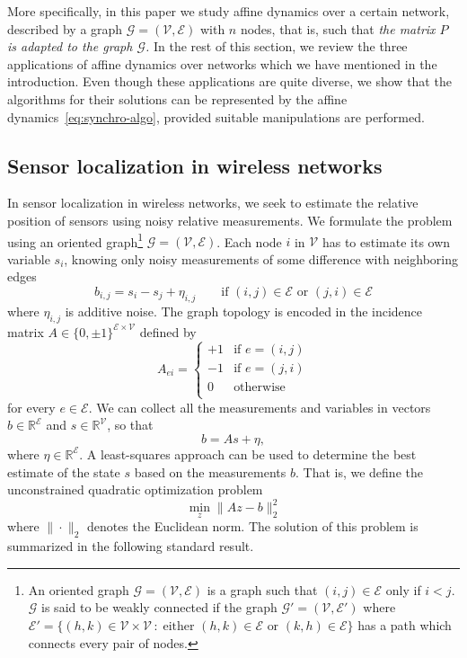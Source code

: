 \documentclass{IEEEtran}
\newcommand{\setdef}[2]{\{#1 \, : \; #2\}}
\newcommand{\real}{\mathbb{R}}
\newcommand{\G}{\mathcal{G}} \newcommand{\V}{\mathcal{V}} \newcommand{\E}{\mathcal{E}}
\newcommand{\1}{\mathbf{1}} \newcommand{\ind}{\mathds{1}}
\begin{document}
More specifically, in this paper we study affine dynamics over a certain network, described by a graph $\G=(\V,\E)$ with $n$ nodes, that is, such that {\em the matrix $P$ is adapted to the graph $\mathcal{G}$.}
In the rest of this section, we review the three applications of affine dynamics over networks which we have mentioned in the introduction. Even though these applications are quite diverse, we show that the algorithms for their solutions can be represented by the affine dynamics~\eqref{eq:synchro-algo}, provided suitable manipulations are performed.

\subsection{Sensor localization in wireless networks}
\label{es1}
In sensor localization in wireless networks, we seek to estimate the relative position of sensors using noisy relative measurements. We formulate the problem using an oriented graph\footnote{
An oriented graph $\G=(\V,\E)$ is a graph such that $(i,j)\in \E$ only if $i<j$. $\G$ is said to be weakly connected if the graph $\G'=(\V,\E')$ where $\E'=\setdef{(h,k)\in \V\times \V}{\text{either $(h,k)\in \E$ or $(k,h)\in \E$}}$  has a path which connects every pair of nodes.} 
 $\mathcal{G}=(\V, \E)$.
Each node $i$ in $\V$ has to estimate its own variable 
$s_i$, knowing only noisy measurements of some difference with neighboring edges
$$
b_{i,j}= s_i- s_j+\eta_{i,j} \qquad \text{if $(i,j)\in \E$ or $(j,i)\in \E$}
$$
where $\eta_{i,j}$ is additive noise.
The graph topology is encoded in the incidence matrix $A\in\{0,\pm1\}^{\mathcal{E}\times\V}$ defined by 
$$
A_{ei}=\begin{cases}
+1&\text{if } e= (i,j)\\
-1&\text{if } e=(j,i)\\
0&\text{otherwise}\\
\end{cases}
$$ for every $e\in \mathcal{E}$. We can collect all the measurements and variables in vectors $b\in \mathbb{R}^{\mathcal{E}}$ and $s\in \real^\V$, so that 
$$ b=A s +\eta,
$$
where $\eta\in\mathbb{R}^{\mathcal{E}}$. 
A least-squares approach can be used to determine the best estimate of the state $s$ based on the measurements $b$. That is, we define the unconstrained quadratic optimization problem
\begin{equation}
\label{LS}
\min_{z} \|A z -b\|_2^2
\end{equation}
where $\|\cdot\|_2$ denotes the Euclidean norm.
The solution of this problem is summarized in the following standard result.
\end{document}
